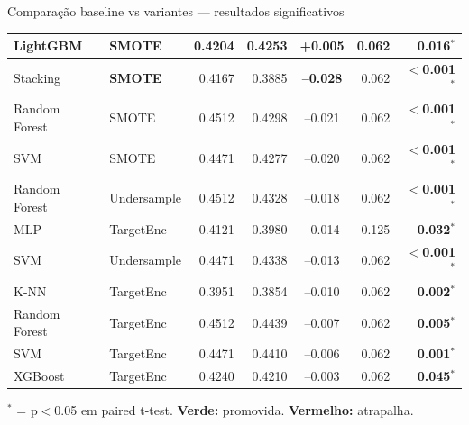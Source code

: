 \documentclass[aspectratio=169]{beamer}
\begin{document}
\begin{frame}[shrink=20]{Comparação baseline vs variantes — resultados significativos}
\begin{tabular}{llrrcrr}
LightGBM      & SMOTE        & 0.4204 & 0.4253 & +0.005 & 0.062 & \textbf{0.016}$^{*}$ \\
\midrule
\rowcolor{red!20}
Stacking      & \textbf{SMOTE} & 0.4167 & 0.3885 & \textbf{--0.028} & 0.062 & \textbf{$<$0.001}$^{*}$ \\
\rowcolor{red!10}
Random Forest & SMOTE        & 0.4512 & 0.4298 & --0.021 & 0.062 & \textbf{$<$0.001}$^{*}$ \\
\rowcolor{red!10}
SVM           & SMOTE        & 0.4471 & 0.4277 & --0.020 & 0.062 & \textbf{$<$0.001}$^{*}$ \\
\rowcolor{red!10}
Random Forest & Undersample  & 0.4512 & 0.4328 & --0.018 & 0.062 & \textbf{$<$0.001}$^{*}$ \\
\rowcolor{red!10}
MLP           & TargetEnc    & 0.4121 & 0.3980 & --0.014 & 0.125 & \textbf{0.032}$^{*}$ \\
\rowcolor{red!10}
SVM           & Undersample  & 0.4471 & 0.4338 & --0.013 & 0.062 & \textbf{$<$0.001}$^{*}$ \\
\rowcolor{red!10}
K-NN          & TargetEnc    & 0.3951 & 0.3854 & --0.010 & 0.062 & \textbf{0.002}$^{*}$ \\
\rowcolor{red!10}
Random Forest & TargetEnc    & 0.4512 & 0.4439 & --0.007 & 0.062 & \textbf{0.005}$^{*}$ \\
\rowcolor{red!10}
SVM           & TargetEnc    & 0.4471 & 0.4410 & --0.006 & 0.062 & \textbf{0.001}$^{*}$ \\
\rowcolor{red!10}
XGBoost       & TargetEnc    & 0.4240 & 0.4210 & --0.003 & 0.062 & \textbf{0.045}$^{*}$ \\
\bottomrule
\end{tabular}

\vspace{0.2em}
\scriptsize $^{*}$ = p$<$0.05 em paired t-test. \textbf{Verde:} promovida. \textbf{Vermelho:} atrapalha.
\end{frame}
\end{document}
